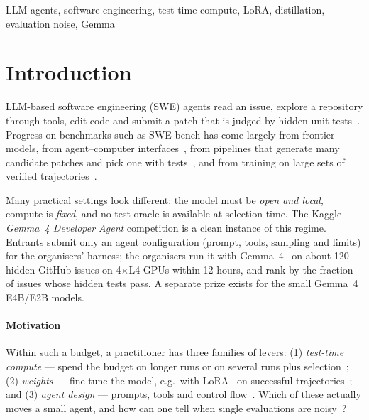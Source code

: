 \documentclass[conference]{IEEEtran}
\begin{document}
\begin{IEEEkeywords}
LLM agents, software engineering, test-time compute, LoRA, distillation, evaluation noise, Gemma
\end{IEEEkeywords}

\section{Introduction}
LLM-based software engineering (SWE) agents read an issue, explore a repository through tools, edit code and submit a patch that is judged by hidden unit tests~\cite{jimenez2024swebench}. Progress on benchmarks such as SWE-bench has come largely from frontier models, from agent--computer interfaces~\cite{yang2024sweagent,wang2024openhands}, from pipelines that generate many candidate patches and pick one with tests~\cite{xia2024agentless,ehrlich2025codemonkeys}, and from training on large sets of verified trajectories~\cite{pan2025swegym,yang2025swesmith}.

Many practical settings look different: the model must be \emph{open and local}, compute is \emph{fixed}, and no test oracle is available at selection time. The Kaggle \emph{Gemma~4 Developer Agent} competition is a clean instance of this regime. Entrants submit only an agent configuration (prompt, tools, sampling and limits) for the organisers' harness; the organisers run it with Gemma~4~\cite{gemma2024,gemma3} on about 120 hidden GitHub issues on 4$\times$L4 GPUs within 12 hours, and rank by the fraction of issues whose hidden tests pass. A separate prize exists for the small Gemma~4 E4B/E2B models.

\paragraph*{Motivation} Within such a budget, a practitioner has three families of levers: (1) \emph{test-time compute} --- spend the budget on longer runs or on several runs plus selection~\cite{brown2024monkeys,snell2024scaling}; (2) \emph{weights} --- fine-tune the model, e.g.\ with LoRA~\cite{hu2022lora} on successful trajectories~\cite{zelikman2022star,yuan2023rft,chen2023fireact}; and (3) \emph{agent design} --- prompts, tools and control flow~\cite{yao2023react,yang2024sweagent}. Which of these actually moves a small agent, and how can one tell when single evaluations are noisy~\cite{kapoor2024agents,miller2024errorbars}?
\end{document}
